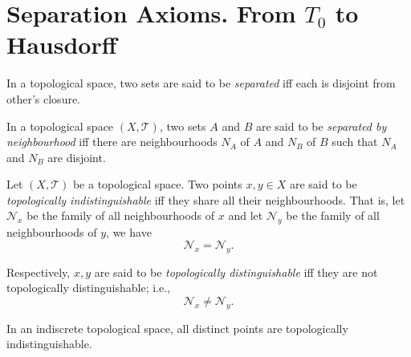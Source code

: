 \section{Separation Axioms. From $T_0$ to Hausdorff}






\begin{definition}
	[saperated]
	\label{def: seperated}
	In a topological space, two sets are said to be \textit{separated} iff each is disjoint from other's closure.
\end{definition}


\begin{definition}
	\label{def: separated by neighbourhoods}
	In a topological space $(X, \mathcal T)$, two sets $A$ and $B$ are said to be \textit{separated by neighbourhood} iff there are neighbourhoods $N_A$ of $A$ and $N_B$ of $B$ such that $N_A$ and $N_B$ are disjoint.
\end{definition}


\begin{definition}
	\label{def: topologically indistinguishable}
	Let $(X, \mathcal T)$ be a topological space. Two points $x,y \in X$ are said to be \textit{topologically indistinguishable} iff they share all their neighbourhoods. That is, let $\mathcal N_x$ be the family of all neighbourhoods of $x$ and let $\mathcal N_y$ be the family of all neighbourhoods of $y$, we have
	$$
	\mathcal N_x = \mathcal N_y.
	$$

	Respectively, $x,y$ are said to be \textit{topologically distinguishable} iff they are not topologically distinguishable; i.e.,
	$$
	\mathcal N_x \ne \mathcal N_y.
	$$
\end{definition}


\begin{example}
	In an indiscrete topological space, all distinct points are topologically indistinguishable.
\end{example}


